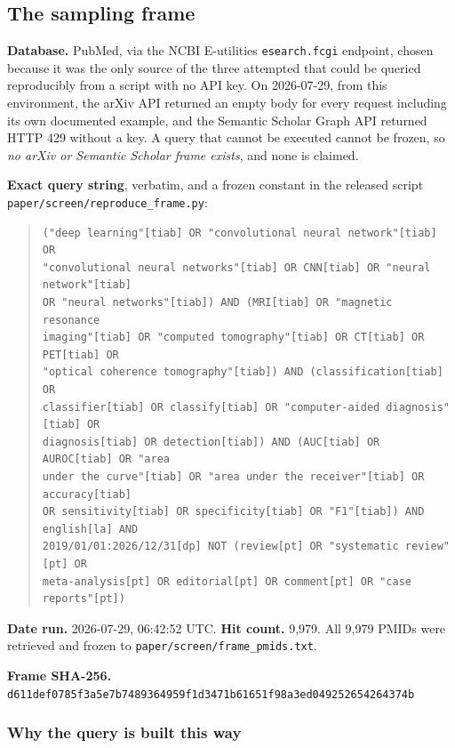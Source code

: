 \documentclass[11pt,a4paper]{article}
\begin{document}
\subsection{The sampling frame}

\textbf{Database.} PubMed, via the NCBI E-utilities \texttt{esearch.fcgi} endpoint,
chosen because it was the only source of the three attempted that could be queried
reproducibly from a script with no API key. On 2026-07-29, from this environment, the
arXiv API returned an empty body for every request including its own documented
example, and the Semantic Scholar Graph API returned HTTP 429 without a key. A query
that cannot be executed cannot be frozen, so \emph{no arXiv or Semantic Scholar frame
exists}, and none is claimed.

\textbf{Exact query string}, verbatim, and a frozen constant in the released
script \texttt{paper/screen/}\allowbreak\texttt{reproduce\_frame.py}:

\begin{quote}\small
\begin{verbatim}
("deep learning"[tiab] OR "convolutional neural network"[tiab] OR
"convolutional neural networks"[tiab] OR CNN[tiab] OR "neural network"[tiab]
OR "neural networks"[tiab]) AND (MRI[tiab] OR "magnetic resonance
imaging"[tiab] OR "computed tomography"[tiab] OR CT[tiab] OR PET[tiab] OR
"optical coherence tomography"[tiab]) AND (classification[tiab] OR
classifier[tiab] OR classify[tiab] OR "computer-aided diagnosis"[tiab] OR
diagnosis[tiab] OR detection[tiab]) AND (AUC[tiab] OR AUROC[tiab] OR "area
under the curve"[tiab] OR "area under the receiver"[tiab] OR accuracy[tiab]
OR sensitivity[tiab] OR specificity[tiab] OR "F1"[tiab]) AND english[la] AND
2019/01/01:2026/12/31[dp] NOT (review[pt] OR "systematic review"[pt] OR
meta-analysis[pt] OR editorial[pt] OR comment[pt] OR "case reports"[pt])
\end{verbatim}
\end{quote}

\textbf{Date run.} 2026-07-29, 06:42:52 UTC. \textbf{Hit count.} 9{,}979. All 9{,}979
PMIDs were retrieved and frozen to \texttt{paper/screen/frame\_pmids.txt}.

\textbf{Frame SHA-256.}\\
\texttt{d611def0785f3a5e7b7489364959f1d3471b61651f98a3ed049252654264374b}

\subsubsection*{Why the query is built this way}
\end{document}
